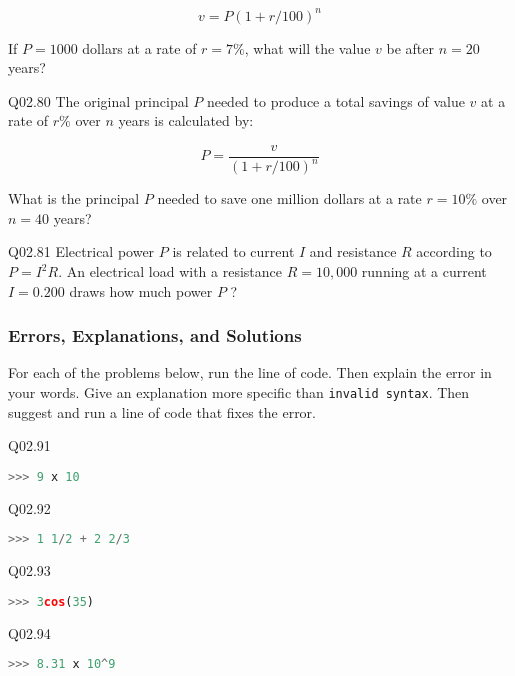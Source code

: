 \documentclass{book}
\newenvironment{problems}{}{}  %
\newcommand{\passthrough}[1]{#1}
\begin{document}
\begin{problems}
\[ v = P(1 + r/100)^n \]

If \(P=1000\) dollars at a rate of \(r=7\%\), what will the value \(v\)
be after \(n=20\) years?

Q02.80 The original principal \(P\) needed to produce a total savings of
value \(v\) at a rate of \(r\%\) over \(n\) years is calculated by:

\[ P = \frac{v}{(1+r/100)^n} \]

What is the principal \(P\) needed to save one million dollars at a rate
\(r=10\%\) over \(n=40\) years?

Q02.81 Electrical power \(P\) is related to current \(I\) and resistance
\(R\) according to \(P = I^2R\). An electrical load with a resistance
\(R = 10,000\) running at a current \(I=0.200\) draws how much power
\(P\) ?
        \end{problems}

    




    
        \hypertarget{errors-explanations-and-solutions}{%
\subsubsection{Errors, Explanations, and
Solutions}\label{errors-explanations-and-solutions}}

For each of the problems below, run the line of code. Then explain the
error in your words. Give an explanation more specific than
\passthrough{\lstinline!invalid syntax!}. Then suggest and run a line of
code that fixes the error.

Q02.91

\begin{lstlisting}[language=Python]
>>> 9 x 10
\end{lstlisting}

Q02.92

\begin{lstlisting}[language=Python]
>>> 1 1/2 + 2 2/3
\end{lstlisting}

Q02.93

\begin{lstlisting}[language=Python]
>>> 3cos(35)
\end{lstlisting}

Q02.94

\begin{lstlisting}[language=Python]
>>> 8.31 x 10^9
\end{lstlisting}
\end{document}
